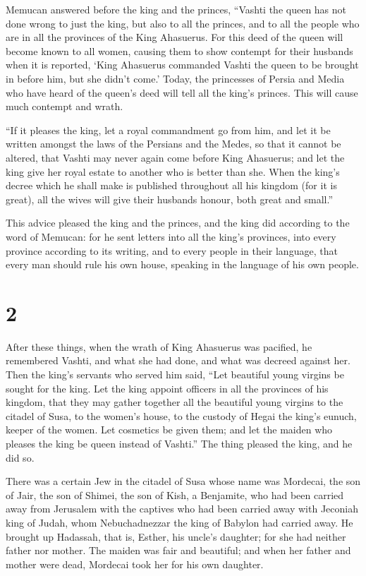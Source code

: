  Memucan answered before the king and the princes, ``Vashti
the queen has not done wrong to just the king, but also to all the
princes, and to all the people who are in all the provinces of the King
Ahasuerus.  For this deed of the queen will become known to
all women, causing them to show contempt for their husbands when it is
reported, `King Ahasuerus commanded Vashti the queen to be brought in
before him, but she didn't come.'  Today, the princesses of
Persia and Media who have heard of the queen's deed will tell all the
king's princes. This will cause much contempt and wrath.

 ``If it pleases the king, let a royal commandment go from
him, and let it be written amongst the laws of the Persians and the
Medes, so that it cannot be altered, that Vashti may never again come
before King Ahasuerus; and let the king give her royal estate to another
who is better than she.  When the king's decree which he
shall make is published throughout all his kingdom (for it is great),
all the wives will give their husbands honour, both great and small.''

 This advice pleased the king and the princes, and the king
did according to the word of Memucan:  for he sent letters
into all the king's provinces, into every province according to its
writing, and to every people in their language, that every man should
rule his own house, speaking in the language of his own people.

\hypertarget{section-1}{%
\section{2}\label{section-1}}

 After these things, when the wrath of King Ahasuerus was
pacified, he remembered Vashti, and what she had done, and what was
decreed against her.  Then the king's servants who served
him said, ``Let beautiful young virgins be sought for the king.
 Let the king appoint officers in all the provinces of his
kingdom, that they may gather together all the beautiful young virgins
to the citadel of Susa, to the women's house, to the custody of Hegai
the king's eunuch, keeper of the women. Let cosmetics be given them;
 and let the maiden who pleases the king be queen instead of
Vashti.'' The thing pleased the king, and he did so.

 There was a certain Jew in the citadel of Susa whose name
was Mordecai, the son of Jair, the son of Shimei, the son of Kish, a
Benjamite,  who had been carried away from Jerusalem with
the captives who had been carried away with Jeconiah king of Judah, whom
Nebuchadnezzar the king of Babylon had carried away.  He
brought up Hadassah, that is, Esther, his uncle's daughter; for she had
neither father nor mother. The maiden was fair and beautiful; and when
her father and mother were dead, Mordecai took her for his own daughter.

